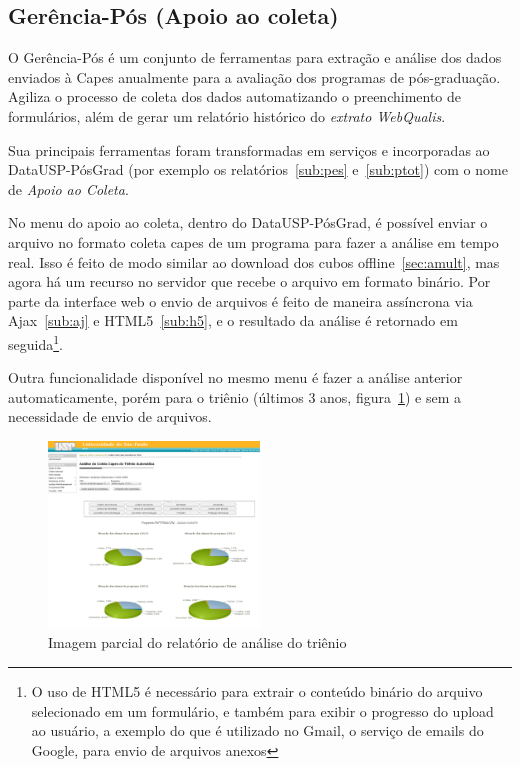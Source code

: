 \subsection{Gerência-Pós (Apoio ao coleta)}
\label{sub:coleta}
O Gerência-Pós é um conjunto de ferramentas para extração e análise dos dados enviados à Capes anualmente para a avaliação dos programas de pós-graduação. Agiliza o processo de coleta dos dados automatizando o preenchimento de formulários, além de gerar um relatório histórico do \emph{extrato WebQualis}.
\par Sua principais ferramentas foram transformadas em serviços e incorporadas ao DataUSP-PósGrad (por exemplo os relatórios~\ref{sub:pes} e~\ref{sub:ptot}) com o nome de \emph{Apoio ao Coleta}. 
\par No menu do apoio ao coleta, dentro do DataUSP-PósGrad, é possível enviar o arquivo no formato coleta capes de um programa para fazer a análise em tempo real. Isso é feito de modo similar ao download dos cubos offline~\ref{sec:amult}, mas agora há um recurso no servidor que recebe o arquivo em formato binário. Por parte da interface web o envio de arquivos é feito de maneira assíncrona via Ajax~\ref{sub:aj} e HTML5~\ref{sub:h5}, e o resultado da análise é retornado em seguida\footnote{O uso de HTML5 é necessário para extrair o conteúdo binário do arquivo selecionado em um formulário, e também para exibir o progresso do upload ao usuário, a exemplo do que é utilizado no Gmail, o serviço de emails do Google, para envio de arquivos anexos}.
\par Outra funcionalidade disponível no mesmo menu é fazer a análise anterior automaticamente, porém para o triênio (últimos 3 anos, figura~\ref{fig:trim}) e sem a necessidade de envio de arquivos.

\begin{figure}[H]
    \centering \includegraphics[width=0.5\textwidth]{figuras/trienio.png}
    \caption{Imagem parcial do relatório de análise do triênio}
    \label{fig:trim}
\end{figure} 

